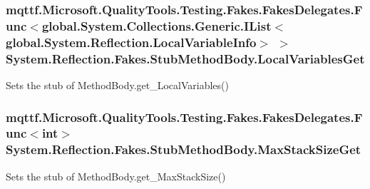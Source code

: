 \hypertarget{class_system_1_1_reflection_1_1_fakes_1_1_stub_method_body_ab69e32044bc17ef058f9e76716d6d6f7}{
\subsubsection[{Local\-Variables\-Get}]{\setlength{\rightskip}{0pt plus 5cm}mqttf.\-Microsoft.\-Quality\-Tools.\-Testing.\-Fakes.\-Fakes\-Delegates.\-Func$<$global.\-System.\-Collections.\-Generic.\-I\-List$<$global.\-System.\-Reflection.\-Local\-Variable\-Info$>$ $>$ System.\-Reflection.\-Fakes.\-Stub\-Method\-Body.\-Local\-Variables\-Get}}\label{class_system_1_1_reflection_1_1_fakes_1_1_stub_method_body_ab69e32044bc17ef058f9e76716d6d6f7}


Sets the stub of Method\-Body.\-get\-\_\-\-Local\-Variables()

\hypertarget{class_system_1_1_reflection_1_1_fakes_1_1_stub_method_body_aa130629f7371e373af9c08af14f8c452}{
\subsubsection[{Max\-Stack\-Size\-Get}]{\setlength{\rightskip}{0pt plus 5cm}mqttf.\-Microsoft.\-Quality\-Tools.\-Testing.\-Fakes.\-Fakes\-Delegates.\-Func$<$int$>$ System.\-Reflection.\-Fakes.\-Stub\-Method\-Body.\-Max\-Stack\-Size\-Get}}\label{class_system_1_1_reflection_1_1_fakes_1_1_stub_method_body_aa130629f7371e373af9c08af14f8c452}


Sets the stub of Method\-Body.\-get\-\_\-\-Max\-Stack\-Size()



